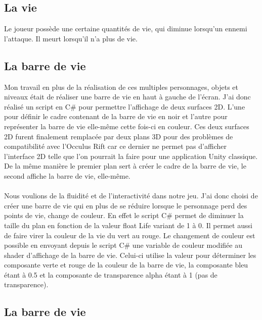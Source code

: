 \documentclass[12pt]{article}
\begin{document}
\subsection{La vie}

Le joueur possède une certaine quantités de vie, qui diminue lorsqu'un ennemi l'attaque. Il meurt lorsqu'il n'a plus de vie.

\subsection{La barre de vie}

Mon travail en plus de la réalisation de ces multiples personnages, objets et niveaux était de réaliser une barre de vie en haut à gauche de l’écran. J’ai donc réalisé un script en C\# pour permettre l’affichage de deux surfaces 2D. L’une pour définir le cadre contenant de la barre de vie en noir et l’autre pour représenter la barre de vie elle-même cette fois-ci en couleur. Ces deux surfaces 2D furent finalement remplacée par deux plans 3D pour des problèmes de compatibilité avec l’Occulus Rift car ce dernier ne permet pas d’afficher l’interface 2D telle que l’on pourrait la faire pour une application Unity classique. De la même manière le premier plan sert à créer le cadre de la barre de vie, le second affiche la barre de vie, elle-même.\\ \\
Nous voulions de la fluidité et de l’interactivité dans notre jeu. J’ai donc choisi de créer une barre de vie qui en plus de se réduire lorsque le personnage perd des points de vie, change de couleur. En effet le script C\# permet de diminuer la taille du plan en fonction de la valeur float Life variant de 1 à 0. Il permet aussi de faire virer la couleur de la vie du vert au rouge. Le changement de couleur est possible en envoyant depuis le script C\# une variable de couleur modifiée au shader d’affichage de la barre de vie. Celui-ci utilise la valeur pour déterminer les composante verte et rouge de la couleur de la barre de vie, la composante bleu étant à 0.5 et la composante de transparence alpha étant à 1 (pas de transparence).

\subsection{La barre de vie}
\end{document}
